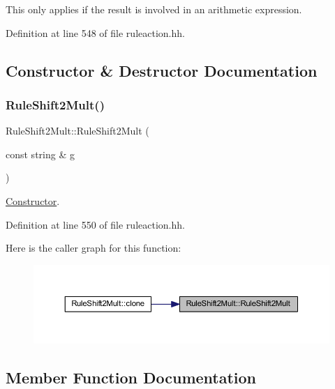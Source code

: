 This only applies if the result is involved in an arithmetic expression. 

Definition at line 548 of file ruleaction.\+hh.



\subsection{Constructor \& Destructor Documentation}
\mbox{\label{class_rule_shift2_mult_a57d7b7773b652a0e945c00bac697eb08}} 
\subsubsection{\texorpdfstring{RuleShift2Mult()}{RuleShift2Mult()}}
{\footnotesize\ttfamily Rule\+Shift2\+Mult\+::\+Rule\+Shift2\+Mult (\begin{DoxyParamCaption}\item[{const string \&}]{g }\end{DoxyParamCaption})\hspace{0.3cm}{\ttfamily [inline]}}



\mbox{\hyperlink{class_constructor}{Constructor}}. 



Definition at line 550 of file ruleaction.\+hh.

Here is the caller graph for this function\+:
\nopagebreak
\begin{figure}[H]
\begin{center}
\leavevmode
\includegraphics[width=350pt]{class_rule_shift2_mult_a57d7b7773b652a0e945c00bac697eb08_icgraph}
\end{center}
\end{figure}


\subsection{Member Function Documentation}
\mbox{\label{class_rule_shift2_mult_a72b5072e94341325dd65f0d48dbb2a04}} 

